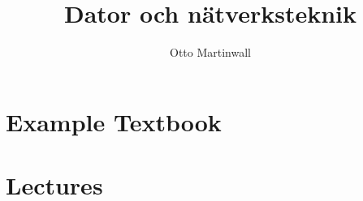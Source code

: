 

\title{Dator och nätverksteknik}
\author{Otto Martinwall}


\maketitle
\tableofcontents
\newpage

\newtheorem{definition}{Definition}
\newtheorem{theorem}{Theorem}

\section{Example Textbook}


\section{Lectures}



